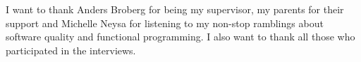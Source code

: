 \documentclass[12pt]{report}
\theoremstyle{definition}
\theoremstyle{theorem}
\begin{document}
I want to thank Anders Broberg for being my supervisor, my parents for their
support and Michelle Neysa for listening to my non-stop ramblings about software
quality and functional programming. I also want to thank all those who participated in the interviews.

\clearpage\newpage
\thispagestyle{empty}

\tableofcontents
\newpage



















\end{document}
